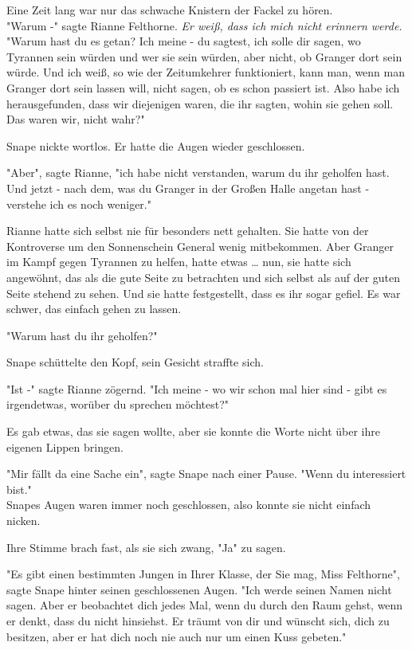 {Eine Zeit lang war nur das schwache Knistern der Fackel zu hören.\\ "Warum -" sagte Rianne Felthorne. \emph{Er weiß, dass ich mich nicht erinnern werde.} "Warum hast du es getan? Ich meine - du sagtest, ich solle dir sagen, wo Tyrannen sein würden und wer sie sein würden, aber nicht, ob Granger dort sein würde. Und ich weiß, so wie der Zeitumkehrer funktioniert, kann man, wenn man Granger dort sein lassen will, nicht sagen, ob es schon passiert ist. Also habe ich herausgefunden, dass wir diejenigen waren, die ihr sagten, wohin sie gehen soll. Das waren wir, nicht wahr?"

Snape nickte wortlos. Er hatte die Augen wieder geschlossen.

"Aber", sagte Rianne, "ich habe nicht verstanden, warum du ihr geholfen hast. Und jetzt - nach dem, was du Granger in der Großen Halle angetan hast - verstehe ich es noch weniger."

Rianne hatte sich selbst nie für besonders nett gehalten. Sie hatte von der Kontroverse um den Sonnenschein General wenig mitbekommen. Aber Granger im Kampf gegen Tyrannen zu helfen, hatte etwas … nun, sie hatte sich angewöhnt, das als die gute Seite zu betrachten und sich selbst als auf der guten Seite stehend zu sehen. Und sie hatte festgestellt, dass es ihr sogar gefiel. Es war schwer, das einfach gehen zu lassen.

"Warum hast du ihr geholfen?"

Snape schüttelte den Kopf, sein Gesicht straffte sich.

"Ist -" sagte Rianne zögernd. "Ich meine - wo wir schon mal hier sind - gibt es irgendetwas, worüber du sprechen möchtest?"

Es gab etwas, das sie sagen wollte, aber sie konnte die Worte nicht über ihre eigenen Lippen bringen.

"Mir fällt da eine Sache ein", sagte Snape nach einer Pause. "Wenn du interessiert bist."\\ Snapes Augen waren immer noch geschlossen, also konnte sie nicht einfach nicken.

Ihre Stimme brach fast, als sie sich zwang, "Ja" zu sagen.

"Es gibt einen bestimmten Jungen in Ihrer Klasse, der Sie mag, Miss Felthorne", sagte Snape hinter seinen geschlossenen Augen. "Ich werde seinen Namen nicht sagen. Aber er beobachtet dich jedes Mal, wenn du durch den Raum gehst, wenn er denkt, dass du nicht hinsiehst. Er träumt von dir und wünscht sich, dich zu besitzen, aber er hat dich noch nie auch nur um einen Kuss gebeten."

}
